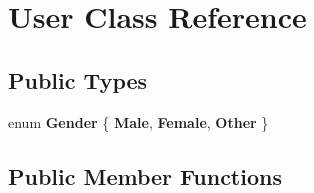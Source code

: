 \hypertarget{classUser}{}\section{User Class Reference}
\label{classUser}
\subsection*{Public Types}
\begin{DoxyCompactItemize}
\item 
\mbox{\label{classUser_a695a51d8dd28c07e517729c0e508941d}} 
enum {\bfseries Gender} \{ {\bfseries Male}, 
{\bfseries Female}, 
{\bfseries Other}
 \}
\end{DoxyCompactItemize}
\subsection*{Public Member Functions}
